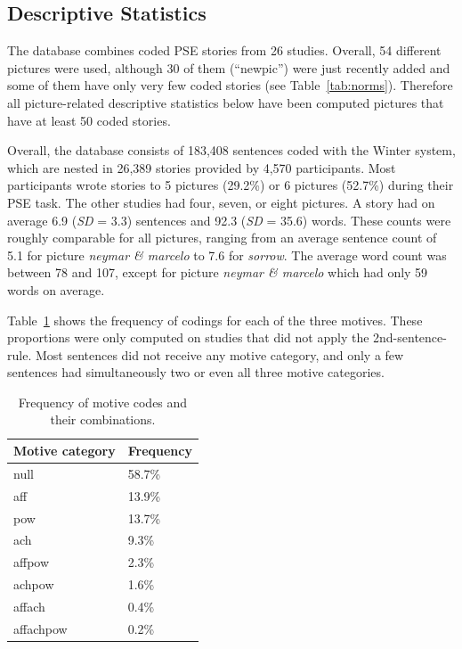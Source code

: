 \documentclass[man,a4paper,mask]{apa6}\usepackage[]{graphicx}\usepackage[]{color}
\begin{document}
\subsection{Descriptive Statistics}

The database combines coded PSE stories from 26 studies. Overall, 54 different pictures were used, although 30 of them (``newpic'') were just recently added and some of them have only very few coded stories (see Table~\ref{tab:norms}). Therefore all picture-related descriptive statistics below have been computed pictures that have at least 50 coded stories.

Overall, the database consists of 183,408 sentences coded with the Winter system, which are nested in 26,389 stories provided by 4,570 participants. Most participants wrote stories to 5 pictures (29.2\%) or 6 pictures (52.7\%) during their PSE task. The other studies had four, seven, or eight pictures. A story had on average 6.9 (\emph{SD} = 3.3) sentences and 92.3 (\emph{SD} = 35.6) words. These counts were roughly comparable for all pictures, ranging from an average sentence count of 5.1 for picture \emph{neymar \& marcelo} to 7.6 for \emph{sorrow}. The average word count was between 78 and 107, except for picture \emph{neymar \& marcelo} which had only 59 words on average.


Table~\ref{tab:motcat} shows the frequency of codings for each of the three motives. These proportions were only computed on studies that did not apply the 2nd-sentence-rule. Most sentences did not receive any motive category, and only a few sentences had simultaneously two or even all three motive categories.

\begin{table}[ht]
\centering
\caption{Frequency of motive codes and their combinations.} 
\label{tab:motcat}
\begin{tabular}{ll}
  \hline
Motive category & Frequency \\ 
  \hline
null & 58.7\% \\ 
  aff & 13.9\% \\ 
  pow & 13.7\% \\ 
  ach & 9.3\% \\ 
  affpow & 2.3\% \\ 
  achpow & 1.6\% \\ 
  affach & 0.4\% \\ 
  affachpow & 0.2\% \\ 
   \hline
\end{tabular}
\end{table}
\end{document}
